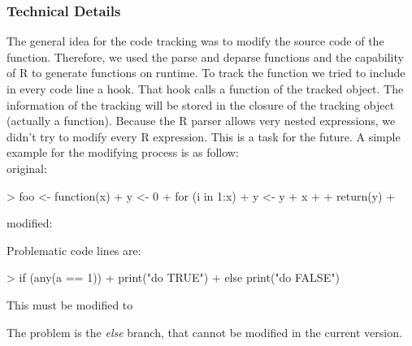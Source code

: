 \documentclass[12pt, a4paper]{article}
\begin{document}
\subsubsection{Technical Details}
The general idea for the code tracking was to modify the source code of the function.
Therefore, we used the parse and deparse functions and the capability of R to generate functions on runtime.
To track the function we tried to include in every code line a hook.
That hook calls a function of the tracked object.
The information of the tracking will be stored in the closure of the tracking object (actually a function).
Because the R parser allows very nested expressions, we didn't try to modify every R expression.
This is a task for the future.
A simple example for the modifying process is as follow:\\
original:
\begin{Schunk}
\begin{Sinput}
> foo <- function(x) {
+     y <- 0
+     for (i in 1:x) {
+         y <- y + x
+     }
+     return(y)
+ }
\end{Sinput}
\end{Schunk}
modified:
\begin{Schunk}
\end{Schunk}

Problematic code lines are:

\begin{Schunk}
\begin{Sinput}
> if (any(a == 1)) {
+     print("do TRUE")
+ } else print("do FALSE")
\end{Sinput}
\end{Schunk}
This must be modified to
\begin{Schunk}
\end{Schunk}
The problem is the \textit{else} branch, that cannot be modified in the current version.
\end{document}
